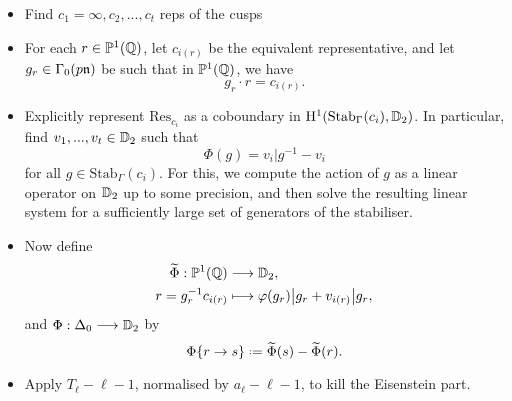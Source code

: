 \documentclass[a4paper,10pt]{article}
\numberwithin{equation}{section}
\begin{document}
\begin{itemize}
	\item Find $c_1 = \infty, c_2, ..., c_t$ reps of the cusps
	\item For each $r \in \mathbb{P}^1(\mathbb{Q})$, let $c_{i(r)}$ be the equivalent representative, and let $g_r \in \Gamma_0(p\mathfrak{n})$ be such that in $\mathbb{P}^1(\mathbb{Q})$, we have
	\[
			g_r \cdot r = c_{i(r)}.
	\]
	\item Explicitly represent $\mathrm{Res}_{c_i}$ as a coboundary in $\mathrm{H}^1(\mathrm{Stab}_{\Gamma}(c_i), \mathbb{D}_2)$. In particular, find $v_1, ..., v_t \in \mathbb{D}_2$ such that 
	\[
		\Phi(g) = v_i|g^{-1} - v_i
	\]
	for all $g \in \mathrm{Stab}_{\Gamma}(c_i).$ For this, we compute the action of $g$ as a linear operator on $\mathbb{D}_2$ up to some precision, and then solve the resulting linear system for a sufficiently large set of generators of the stabiliser.
	
	\item Now define
	\begin{align*}
		\widetilde{\Phi} : \mathbb{P}^1(\mathbb{Q}) &\longrightarrow \mathbb{D}_2,\\
				r = g_r^{-1}c_{i(r)} &\longmapsto \varphi(g_r)\big|g_r + v_{i(r)}\big|g_r,
	\end{align*}
	and $\Phi : \Delta_0 \longrightarrow \mathbb{D}_2$ by
	\[
		\Phi\{r\to s\} \defeq \widetilde{\Phi}(s) - \widetilde{\Phi}(r).
	\]
	\item Apply $T_\ell - \ell - 1$, normalised by $a_\ell - \ell - 1$, to kill the Eisenstein part.
\end{itemize}	
	
\end{document}

